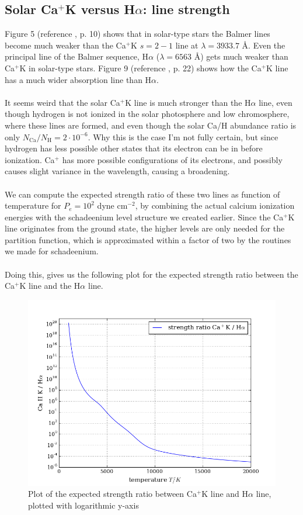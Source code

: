\documentclass{article}
\begin{document}
\subsection{Solar Ca$^+$K versus H$\alpha$: line strength}
Figure 5 (reference \cite{cite:ssa}, p. 10) shows that in solar-type stars the Balmer lines become much weaker than the Ca$^+$K $s=2-1$ line at $\lambda = 3933.7$ Å. Even the principal line of the Balmer sequence, H$\alpha$ ($\lambda = 6563$ Å) gets much weaker than Ca$^+$K in solar-type stars. Figure 9 (reference \cite{cite:ssa}, p. 22) shows how the Ca$^+$K line has a much wider absorption line than H$\alpha$.\\\\
It seems weird that the solar Ca$^+$K line is much stronger than the H$\alpha$ line, even though hydrogen is not ionized in the solar photosphere and low chromosphere, where these lines are formed, and even though the solar Ca/H abundance ratio is only $N_{\text{Ca}}/N_{\text{H}} = 2\cdot10^{-6}$. Why this is the case I'm not fully certain, but since hydrogen has less possible other states that its electron can be in before ionization. Ca$^+$ has more possible configurations of its electrons, and possibly causes slight variance in the wavelength, causing a broadening.\\\\
We can compute the expected strength ratio of these two lines as function of temperature for $P_e = 10^2$ dyne cm$^{-2}$, by combining the actual calcium ionization energies with the schadeenium level structure we created earlier. Since the Ca$^+$K line originates from the ground state, the higher levels are only needed for the partition function, which is approximated within a factor of two by the routines we made for schadeenium.\\\\
Doing this, gives us the following plot for the expected strength ratio between the Ca$^+$K line and the H$\alpha$ line.
\begin{figure}[H]
  \centering
  \includegraphics[scale=0.5]{ssa_Ca_Halpha.png}
  \caption{Plot of the expected strength ratio between Ca$^+$K line and H$\alpha$ line, plotted with logarithmic y-axis}
  \label{fig:HCa_strength}
\end{figure}
\end{document}
